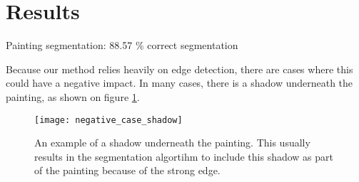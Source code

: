 \section{Results}
	Painting segmentation: 88.57 \% correct segmentation
	
	
	
	Because our method relies heavily on edge detection, there are cases where this could have a negative impact. In many cases, there is a shadow underneath the painting, as shown on figure \ref{fig:negative_case_shadow}.
	
	\begin{figure}
		\texttt{[image: negative\_case\_shadow]}
		\caption{An example of a shadow underneath the painting. This usually results in the segmentation algortihm to include this shadow as part of the painting because of the strong edge.}
		\label{fig:negative_case_shadow}
	\end{figure}